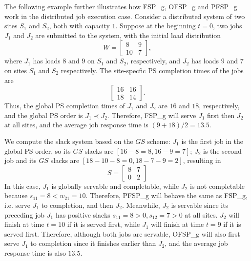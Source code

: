 The following example further illustrates how FSP\_g, OFSP\_g and PFSP\_g work in the distributed job execution case. Consider a distributed system of two sites $S_1$ and $S_2$, both with capacity $1$. Suppose at the beginning $t=0$, two jobs $J_1$ and $J_2$ are submitted to the system, with the initial load distribution 
\begin{equation}
    W = \begin{bmatrix} 8 & 9 \\ 10 & 7 \end{bmatrix},
\end{equation}
where $J_1$ has loads $8$ and $9$ on $S_1$ and $S_2$, respectively, and $J_2$ has loads $9$ and $7$ on sites $S_1$ and $S_2$ respectively. The site-specfic PS completion times of the jobs are
\begin{equation}
    \begin{bmatrix} 16 & 16 \\ 18 & 14 \end{bmatrix}.
\end{equation}
Thus, the global PS completion times of $J_1$ and $J_2$ are $16$ and $18$, respectively, and the global PS order is $J_1 \prec J_2$. Therefore, FSP\_g will serve $J_1$ first then $J_2$ at all sites, and the average job response time is $(9+18)/2=13.5$.

We compute the slack system based on the $GS$ scheme: $J_1$ is the first job in the global PS order, so its $GS$ slacks are $[16 - 8=8, 16-9=7]$; $J_2$ is the second job and its $GS$ slacks are $[18 - 10 - 8=0, 18-7-9=2]$, resulting in 
\begin{equation}
    S = \begin{bmatrix} 8 & 7 \\ 0 & 2 \end{bmatrix}
\end{equation}
 In this case, $J_1$ is globally servable and completable, while $J_2$ is not completable because $s_{11} = 8 < w_{21} = 10$. Therefore, PFSP\_g will behave the same as FSP\_g, i.e. serve $J_1$ to completion, and then $J_2$. Meanwhile, $J_2$ is servable since its preceding job $J_1$ has positive slacks $s_{11}=8>0, s_{12}=7>0$ at all sites. $J_2$ will finish at time $t=10$ if it is served first, while $J_1$ will finish at time $t=9$ if it is served first. Therefore, although both jobs are servable, OFSP\_g will also first serve $J_1$ to completion since it finishes earlier than $J_2$, and the average job response time is also $13.5$. 

